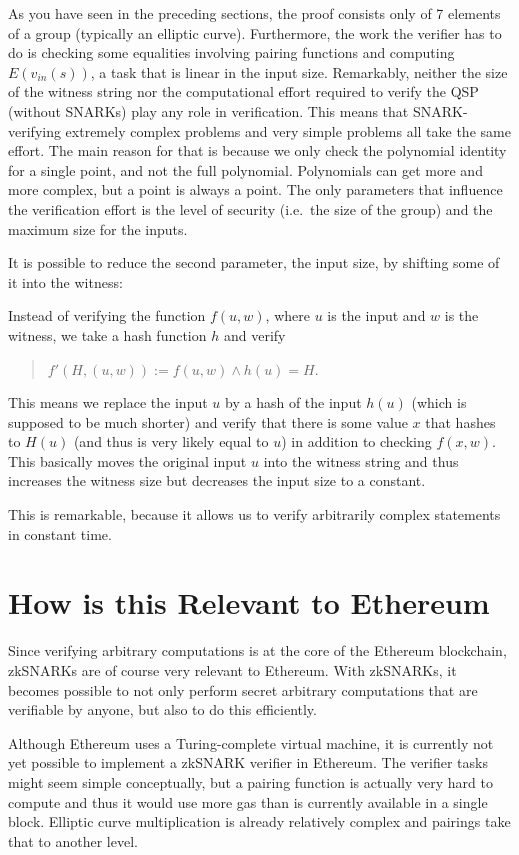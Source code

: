 \documentclass[11pt,letterpaper]{article}
\begin{document}
As you have seen in the preceding sections, the proof consists only of 7 elements of a group (typically an elliptic curve). Furthermore, the work the verifier has to do is checking some equalities involving pairing functions and computing $E(v_{in}(s))$, a task that is linear in the input size. Remarkably, neither the size of the witness string nor the computational effort required to verify the QSP (without SNARKs) play any role in verification. This means that SNARK-verifying extremely complex problems and very simple problems all take the same effort. The main reason for that is because we only check the polynomial identity for a single point, and not the full polynomial. Polynomials can get more and more complex, but a point is always a point. The only parameters that influence the verification effort is the level of security (i.e.\ the size of the group) and the maximum size for the inputs.


It is possible to reduce the second parameter, the input size, by shifting some of it into the witness:


Instead of verifying the function $f(u, w)$, where $u$ is the input and $w$ is the witness, we take a hash function $h$ and verify
\begin{quote}
$f'(H, (u, w)) := f(u, w) \land h(u) = H$.
\end{quote}


This means we replace the input $u$ by a hash of the input $h(u)$ (which is supposed to be much shorter) and verify that there is some value $x$ that hashes to $H(u)$ (and thus is very likely equal to $u$) in addition to checking $f(x, w)$. This basically moves the original input $u$ into the witness string and thus increases the witness size but decreases the input size to a constant.


This is remarkable, because it allows us to verify arbitrarily complex statements in constant time.

\section{How is this Relevant to Ethereum}


Since verifying arbitrary computations is at the core of the Ethereum blockchain, zkSNARKs are of course very relevant to Ethereum. With zkSNARKs, it becomes possible to not only perform secret arbitrary computations that are verifiable by anyone, but also to do this efficiently.


Although Ethereum uses a Turing-complete virtual machine, it is currently not yet possible to implement a zkSNARK verifier in Ethereum. The verifier tasks might seem simple conceptually, but a pairing function is actually very hard to compute and thus it would use more gas than is currently available in a single block. Elliptic curve multiplication is already relatively complex and pairings take that to another level.
\end{document}
